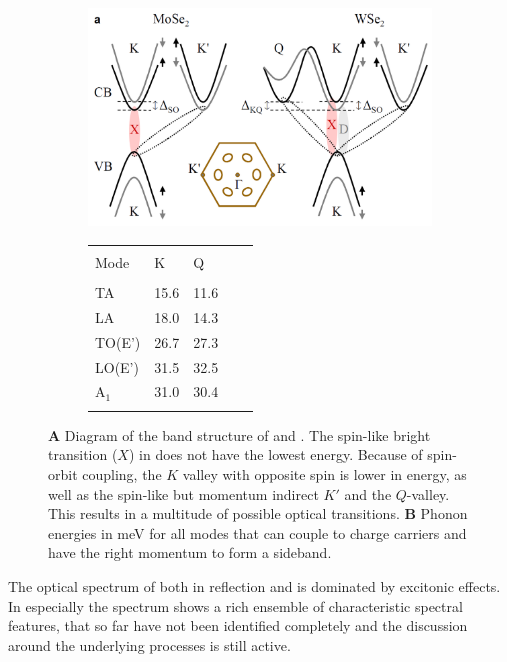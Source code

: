 \begin{figure}[t]
\centering
\begin{subfigure}{0.69\textwidth}
	\caption{}
	\includegraphics[width=.8\textwidth]{Band_structure_momentum_dark}
\end{subfigure}
\begin{subfigure}{0.3\textwidth}
	\caption{}
	\begin{tabular}{lllll}
	\hline
	\hline\\
	Mode&K&Q\\
	\hline\\
	TA&15.6&11.6\\
	LA&18.0&14.3\\
	TO(E')&26.7&27.3\\
	LO(E')&31.5&32.5\\
	A$_1$&31.0&30.4\\
	\\\hline
	\end{tabular}
\end{subfigure}
\caption{\textbf{A} Diagram of the band structure of \mose and \wse\!. The spin-like bright transition ($X$) in \wse does not have the lowest energy. Because of spin-orbit coupling, the $K$ valley with opposite spin is lower in energy, as well as the spin-like but momentum indirect $K'$ and the $Q$-valley. This results in a multitude of possible optical transitions. \textbf{B} Phonon energies in meV for all modes that can couple to charge carriers and have the right momentum to form a sideband\cite{jin_intrinsic_2014}.}\label{phonon_band}
\end{figure}

The optical spectrum of \tmds both in reflection and \pl is dominated by excitonic effects. In \wse especially the \pl spectrum shows a rich ensemble of characteristic spectral features, that so far have not been identified completely and the discussion around the underlying processes is still active.

